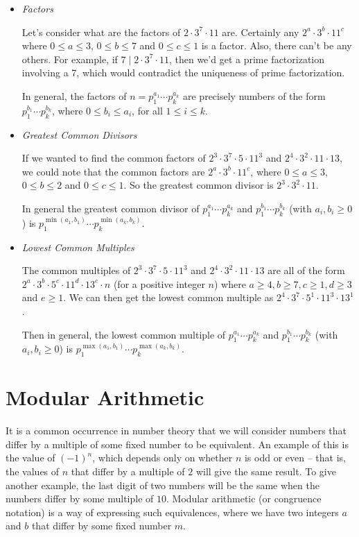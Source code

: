 \documentclass[a4paper]{scrreprt}
\begin{document}
\begin{itemize}
	\item \emph{Factors}
	
	Let's consider what are the factors of $2 \cdot 3^7 \cdot 11$ are. Certainly any $2^a \cdot 3^b \cdot 11^c$ where $0 \leq a \leq 3$, $0 \leq b \leq 7$ and $0 \leq c \leq 1$ is a factor. Also, there can't be any others. For example, if $7 \mid 2 \cdot 3^7 \cdot 11$, then we'd get a prime factorization involving a 7, which would contradict the uniqueness of prime factorization.

	In general, the factors of $n = p_1^{a_1} \cdots p_k^{a_k}$ are precisely numbers of the form $p_1^{b_1} \cdots p_k^{b_k}$, where $0 \leq b_i \leq a_i$, for all $1 \leq i \leq k$.

	\item \emph{Greatest Common Divisors}
	
	If we wanted to find the common factors of $2^3 \cdot 3^7 \cdot 5 \cdot 11^3$ and $2^4 \cdot 3^2 \cdot 11 \cdot 13$, we could note that the common factors are $2^a \cdot 3^b \cdot 11^c$, where $0 \leq a \leq 3$, $0 \leq b \leq 2$ and $0 \leq c \leq 1$.
	So the greatest common divisor is $2^3 \cdot 3^2 \cdot 11$.

	In general the greatest common divisor of $p_1^{a_1} \cdots p_k^{a_k}$ and $p_1^{b_1} \cdots p_k^{b_k}$ (with $a_i, b_i \geq 0$) is $p_1^{\min(a_1, b_1)} \cdots p_k^{\min(a_k, b_k)}$.

	\item \emph{Lowest Common Multiples}
	
	The common multiples of $2^3 \cdot 3^7 \cdot 5 \cdot 11^3$ and $2^4 \cdot 3^2 \cdot 11 \cdot 13$ are all of the form $2^a \cdot 3^b \cdot 5^c \cdot 11^d \cdot 13^e \cdot n$ (for a positive integer $n$) where $a \geq 4, b\geq 7, c\geq 1, d\geq 3$ and $e \geq 1$. We can then get the lowest common multiple as $2^4 \cdot 3^7 \cdot 5^1 \cdot 11^3 \cdot 13^1$.

	Then in general, the lowest common multiple of $p_1^{a_1} \cdots p_k^{a_k}$ and $p_1^{b_1} \cdots p_k^{b_k}$ (with $a_i, b_i \geq 0$) is $p_1^{\max(a_1, b_1)} \cdots p_k^{\max(a_k, b_k)}$.
\end{itemize}



\section{Modular Arithmetic}

It is a common occurrence in number theory that we will consider numbers that differ by a multiple of some fixed number to be equivalent. 
An example of this is the value of $(-1)^n$, which depends only on whether $n$ is odd or even -- that is, the values of $n$ that differ by a multiple of $2$ will give the same result. To give another example, the last digit of two numbers will be the same when the numbers differ by some multiple of $10$. Modular arithmetic (or congruence notation) is a way of expressing such equivalences, where we have two integers $a$ and $b$ that differ by some fixed number $m$.
\end{document}

